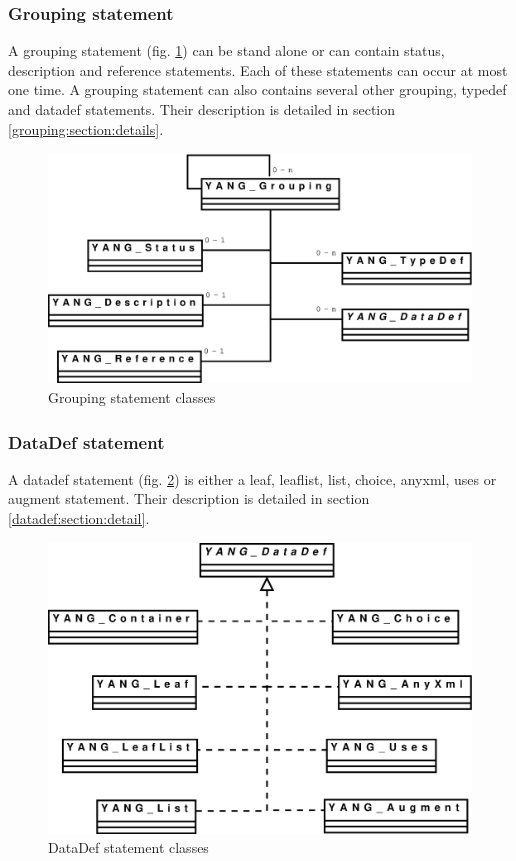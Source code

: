 \documentclass[a4paper]{article}
\begin{document}
\subsubsection{Grouping statement}
\label{grouping:section:global}

A grouping statement (fig.  \ref{grouping})  can be stand alone or can
contain status,  description and reference statements.   Each of these
statements can occur at most one time. A grouping statement can also
contains  several  other  grouping,  typedef and  datadef  statements.
Their       description       is       detailed      in       section
\ref{grouping:section:details}.
\begin{figure}[htbp]
\begin{center}
\includegraphics[scale = .3]{grouping.eps}
\end{center}
\caption{Grouping statement classes}
\label{grouping}
\end{figure}

\subsubsection{DataDef statement}
\label{datadef:section:global}

A datadef  statement (fig. \ref{datadef}) is either  a leaf, leaflist,
list, choice,  anyxml, uses or augment  statement. Their description is
detailed in section \ref{datadef:section:detail}.
\begin{figure}[htbp]
\begin{center}
\includegraphics[scale = .3]{datadef.eps}
\end{center}
\caption{DataDef statement classes}
\label{datadef}
\end{figure}
\end{document}
